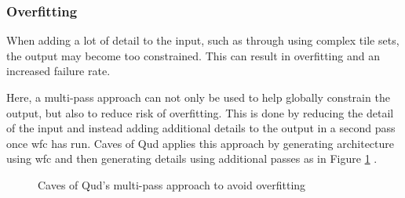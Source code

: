 \subsubsection{Overfitting}
When adding a lot of detail to the input, such as through using complex tile sets, the output may become too constrained. This can result in overfitting and an increased failure rate.

Here, a multi-pass approach can not only be used to help globally constrain the output, but also to reduce risk of overfitting. This is done by reducing the detail of the input and instead adding additional details to the output in a second pass once \acrshort{wfc} has run. Caves of Qud applies this approach by generating architecture using \acrshort{wfc} and then generating details using additional passes as in Figure \ref{fig:cavesOfQudWFCOverfitting} \cite{GDC_caves_of_qud}.

\begin{figure}[H]
    \centering
    \hfill
    \caption{Caves of Qud's multi-pass approach to avoid overfitting \cite{GDC_caves_of_qud}}
    \label{fig:cavesOfQudWFCOverfitting}
\end{figure}

